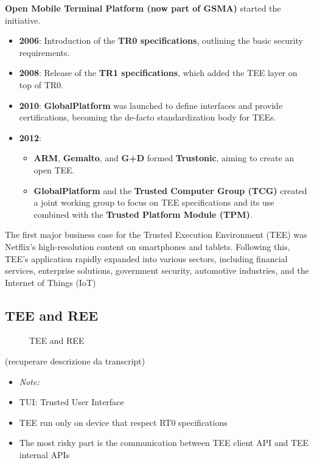 \textbf{Open Mobile Terminal Platform (now part of GSMA)} started the initiative.
\begin{itemize}[itemsep=0pt]
    \item \textbf{2006}: Introduction of the \textbf{TR0 specifications}, outlining the basic security requirements.
    \item \textbf{2008}: Release of the \textbf{TR1 specifications}, which added the TEE layer on top of TR0.
    \item \textbf{2010}: \textbf{GlobalPlatform} was launched to define interfaces and provide certifications, becoming the de-facto standardization body for TEEs.
    \item \textbf{2012}:
    \begin{itemize}[itemsep=0pt]
        \item \textbf{ARM}, \textbf{Gemalto}, and \textbf{G+D} formed \textbf{Trustonic}, aiming to create an open TEE.
        \item \textbf{GlobalPlatform} and the \textbf{Trusted Computer Group (TCG)} created a joint working group to focus on TEE specifications and its use combined with the \textbf{Trusted Platform Module (TPM)}.
    \end{itemize}
\end{itemize}
The first major business case for the Trusted Execution Environment (TEE) was Netflix's high-resolution content on smartphones and tablets. Following this, TEE's application rapidly expanded into various sectors, including financial services, enterprise solutions, government security, automotive industries, and the Internet of Things (IoT)

\subsection{TEE and REE}
\begin{figure}[h]
    \centering
    \caption{TEE and REE}
    \label{fig:tee_ree}
\end{figure}
(recuperare descrizione da transcript)
\begin{itemize}[itemsep=0pt]
    \item \textit{Note:}
    \item TUI: Trusted User Interface
    \item TEE run only on device that respect RT0 specifications
    \item The most risky part is the communication between TEE client API and TEE internal APIs 
\end{itemize}


